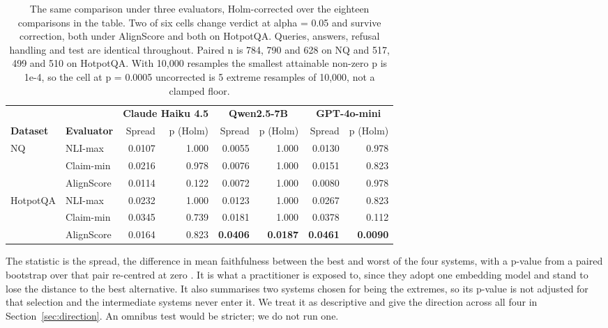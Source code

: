 \documentclass[11pt]{article}
\begin{document}
\begin{table}[t]
\centering
\small
\begin{tabular}{llrrrrrr}
\toprule
 & & \multicolumn{2}{c}{\textbf{Claude Haiku 4.5}} & \multicolumn{2}{c}{\textbf{Qwen2.5-7B}} & \multicolumn{2}{c}{\textbf{GPT-4o-mini}} \\
\cmidrule(lr){3-4}\cmidrule(lr){5-6}\cmidrule(lr){7-8}
\textbf{Dataset} & \textbf{Evaluator} & Spread & p (Holm) & Spread & p (Holm) & Spread & p (Holm) \\
\midrule
NQ & NLI-max & 0.0107 & 1.000 & 0.0055 & 1.000 & 0.0130 & 0.978 \\
 & Claim-min & 0.0216 & 0.978 & 0.0076 & 1.000 & 0.0151 & 0.823 \\
 & AlignScore & 0.0114 & 0.122 & 0.0072 & 1.000 & 0.0080 & 0.978 \\
\midrule
HotpotQA & NLI-max & 0.0232 & 1.000 & 0.0123 & 1.000 & 0.0267 & 0.823 \\
 & Claim-min & 0.0345 & 0.739 & 0.0181 & 1.000 & 0.0378 & 0.112 \\
 & AlignScore & 0.0164 & 0.823 & \textbf{0.0406} & \textbf{0.0187} & \textbf{0.0461} & \textbf{0.0090} \\
\bottomrule
\end{tabular}
\caption{The same comparison under three evaluators, Holm-corrected over the eighteen comparisons in the table. Two of six cells change verdict at alpha = 0.05 and survive correction, both under AlignScore and both on HotpotQA. Queries, answers, refusal handling and test are identical throughout. Paired n is 784, 790 and 628 on NQ and 517, 499 and 510 on HotpotQA. With 10,000 resamples the smallest attainable non-zero p is 1e-4, so the cell at p = 0.0005 uncorrected is 5 extreme resamples of 10,000, not a clamped floor.}
\label{tab:7}
\end{table}

The statistic is the spread, the difference in mean faithfulness between the best and worst of the four systems, with a p-value from a paired bootstrap over that pair re-centred at zero \citep{dror-etal-2018}. It is what a practitioner is exposed to, since they adopt one embedding model and stand to lose the distance to the best alternative. It also summarises two systems chosen for being the extremes, so its p-value is not adjusted for that selection and the intermediate systems never enter it. We treat it as descriptive and give the direction across all four in Section~\ref{sec:direction}. An omnibus test would be stricter; we do not run one.
\end{document}
